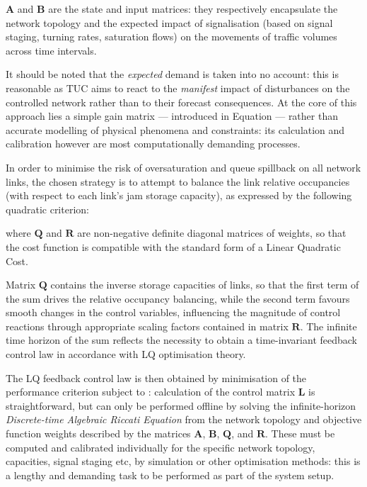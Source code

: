 $\mathbf{A}$ and $\mathbf{B}$ are the state and input matrices: they respectively encapsulate the network topology and the expected impact of signalisation (based on signal staging, turning rates,
saturation flows) on the movements of traffic volumes across time intervals.

It should be noted that the \emph{expected} demand is taken into no account: this is reasonable as
TUC aims to react to the \emph{manifest} impact of disturbances on the controlled network rather
than to their forecast consequences.
At the core of this approach lies a simple gain matrix — introduced in Equation  —
rather than accurate modelling of physical phenomena and constraints: its calculation and
calibration however are most computationally demanding processes.

In order to minimise the risk of oversaturation and queue spillback on all network links,
the chosen strategy is to attempt to balance the link relative occupancies (with respect to each
link’s jam storage capacity), as expressed by the following quadratic criterion:

where $\mathbf{Q}$ and $\mathbf{R}$ are non-negative definite diagonal matrices of weights, so that the cost function is compatible with the standard form of a Linear Quadratic Cost.

Matrix $\mathbf{Q}$ contains the inverse storage capacities of links, so that the first term of the sum drives the relative occupancy balancing, while the second term favours smooth changes in the control variables, influencing the magnitude of control reactions through appropriate scaling factors contained in matrix $\mathbf{R}$.
The infinite time horizon of the sum reflects the necessity to obtain a time-invariant feedback control law in accordance with LQ optimisation theory.

The LQ feedback control law is then obtained by minimisation of the performance
criterion  subject to : calculation of the control matrix $\mathbf{L}$ is straightforward, but can only be performed offline by solving the infinite-horizon \emph{Discrete-time Algebraic Riccati Equation} from the network topology and objective function weights described by the matrices $\mathbf{A}$, $\mathbf{B}$, $\mathbf{Q}$, and $\mathbf{R}$. These must be computed and calibrated individually for the specific network topology, capacities, signal staging etc, by simulation or other optimisation methods: this is a lengthy and demanding task to be performed as part of the system setup.

